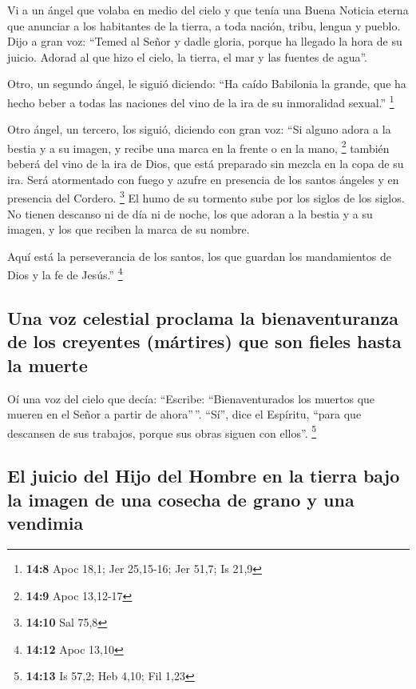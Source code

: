 \begin{paracol}{2}
 Vi a un ángel que volaba en medio del cielo y que tenía
una Buena Noticia eterna que anunciar a los habitantes de la tierra, a
toda nación, tribu, lengua y pueblo.  Dijo a gran voz:
``Temed al Señor y dadle gloria, porque ha llegado la hora de su juicio.
Adorad al que hizo el cielo, la tierra, el mar y las fuentes de agua''.

 Otro, un segundo ángel, le siguió diciendo: ``Ha caído
Babilonia la grande, que ha hecho beber a todas las naciones del vino de
la ira de su inmoralidad sexual.'' \footnote{\textbf{14:8} Apoc 18,1;
  Jer 25,15-16; Jer 51,7; Is 21,9}

 Otro ángel, un tercero, los siguió, diciendo con gran
voz: ``Si alguno adora a la bestia y a su imagen, y recibe una marca en
la frente o en la mano, \footnote{\textbf{14:9} Apoc 13,12-17}
 también beberá del vino de la ira de Dios, que está
preparado sin mezcla en la copa de su ira. Será atormentado con fuego y
azufre en presencia de los santos ángeles y en presencia del Cordero.
\footnote{\textbf{14:10} Sal 75,8}  El humo de su
tormento sube por los siglos de los siglos. No tienen descanso ni de día
ni de noche, los que adoran a la bestia y a su imagen, y los que reciben
la marca de su nombre.

 Aquí está la perseverancia de los santos, los que
guardan los mandamientos de Dios y la fe de Jesús.'' \footnote{\textbf{14:12}
  Apoc 13,10}

\hypertarget{una-voz-celestial-proclama-la-bienaventuranza-de-los-creyentes-muxe1rtires-que-son-fieles-hasta-la-muerte}{%
\subsection{Una voz celestial proclama la bienaventuranza de los
creyentes (mártires) que son fieles hasta la
muerte}\label{una-voz-celestial-proclama-la-bienaventuranza-de-los-creyentes-muxe1rtires-que-son-fieles-hasta-la-muerte}}

 Oí una voz del cielo que decía: ``Escribe:
``Bienaventurados los muertos que mueren en el Señor a partir de
ahora''\,''. ``Sí'', dice el Espíritu, ``para que descansen de sus
trabajos, porque sus obras siguen con ellos''. \footnote{\textbf{14:13}
  Is 57,2; Heb 4,10; Fil 1,23}

\hypertarget{el-juicio-del-hijo-del-hombre-en-la-tierra-bajo-la-imagen-de-una-cosecha-de-grano-y-una-vendimia}{%
\subsection{El juicio del Hijo del Hombre en la tierra bajo la imagen de
una cosecha de grano y una
vendimia}\label{el-juicio-del-hijo-del-hombre-en-la-tierra-bajo-la-imagen-de-una-cosecha-de-grano-y-una-vendimia}}


\end{paracol}
